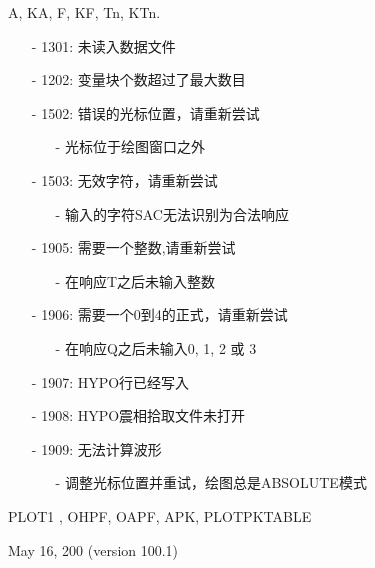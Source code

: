 A, KA, F, KF, Tn, KTn.

\begin{itemize}
\item[-]1301: 未读入数据文件
\item[-]1202: 变量块个数超过了最大数目
\end{itemize}

\begin{itemize}
\item[-]1502: 错误的光标位置，请重新尝试
	\begin{itemize}
	\item[-]光标位于绘图窗口之外
	\end{itemize}

\item[-]1503: 无效字符，请重新尝试
	\begin{itemize}
 	\item[-]输入的字符SAC无法识别为合法响应
	\end{itemize}
\item[-]1905: 需要一个整数,请重新尝试
	\begin{itemize}
 	\item[-]在响应T之后未输入整数
	\end{itemize}
\item[-]1906: 需要一个0到4的正式，请重新尝试
	\begin{itemize}
  	\item[-]在响应Q之后未输入0, 1, 2 或 3
	\end{itemize}
\item[-]1907: HYPO行已经写入
\item[-]1908: HYPO震相拾取文件未打开
\item[-] 1909: 无法计算波形
	\begin{itemize}
  	\item[-]调整光标位置并重试，绘图总是ABSOLUTE模式
	\end{itemize}
\end{itemize}

PLOT1 , OHPF, OAPF, APK, PLOTPKTABLE

May 16, 200 (version 100.1)
